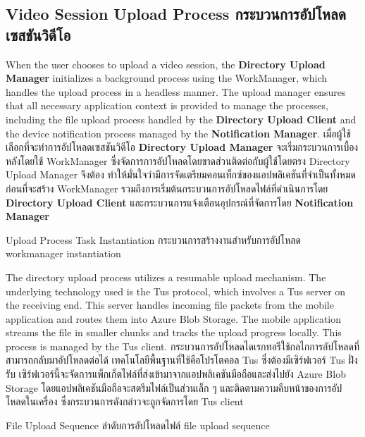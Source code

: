 \subsection{\ifenglish Video Session Upload Process \else กระบวนการอัปโหลดเซสชันวิดีโอ \fi}

\ifenglish
When the user chooses to upload a video session, the \textbf{Directory Upload Manager} initializes a background process using the WorkManager, which handles the upload process in a headless manner. The upload manager ensures that all necessary application context is provided to manage the processes, including the file upload process handled by the \textbf{Directory Upload Client} and the device notification process managed by the \textbf{Notification Manager}.
\else
เมื่อผู้ใช้เลือกที่จะทำการอัปโหลดเซสชันวิดีโอ \textbf{Directory Upload Manager} จะเริ่มกระบวนการเบื้องหลังโดยใช้ WorkManager ซึ่งจัดการการอัปโหลดโดยขาดส่วนติดต่อกับผู้ใช้โดยตรง Directory Upload Manager จึงต้อง ทำให้มั่นใจว่ามีการจัดเตรียมคอนเท็กซ์ของแอปพลิเคชันที่จำเป็นทั้งหมดก่อนที่จะสร้าง WorkManager รวมถึงการเริ่มต้นกระบวนการอัปโหลดไฟล์ที่ดำเนินการโดย \textbf{Directory Upload Client} และกระบวนการแจ้งเตือนอุปกรณ์ที่จัดการโดย \textbf{Notification Manager}
\fi

{\ifenglish Upload Process Task Instantiation \else กระบวนการสร้างงานสำหรับการอัปโหลด \fi}
{workmanager instantiation}

\ifenglish
The directory upload process utilizes a resumable upload mechanism. The underlying technology used is the Tus protocol, which involves a Tus server on the receiving end. This server handles incoming file packets from the mobile application and routes them into Azure Blob Storage. The mobile application streams the file in smaller chunks and tracks the upload progress locally. This process is managed by the Tus client.
\else
กระบวนการอัปโหลดไดเรกทอรีใช้กลไกการอัปโหลดที่สามารถกลับมาอัปโหลดต่อได้ เทคโนโลยีพื้นฐานที่ใช้คือโปรโตคอล Tus ซึ่งต้องมีเซิร์ฟเวอร์ Tus ฝั่งรับ เซิร์ฟเวอร์นี้จะจัดการแพ็กเก็ตไฟล์ที่ส่งเข้ามาจากแอปพลิเคชันมือถือและส่งไปยัง Azure Blob Storage โดยแอปพลิเคชันมือถือจะสตรีมไฟล์เป็นส่วนเล็ก ๆ และติดตามความคืบหน้าของการอัปโหลดในเครื่อง ซึ่งกระบวนการดังกล่าวจะถูกจัดการโดย Tus client
\fi

{\ifenglish File Upload Sequence \else ลำดับการอัปโหลดไฟล์ \fi}
{file upload sequence}

